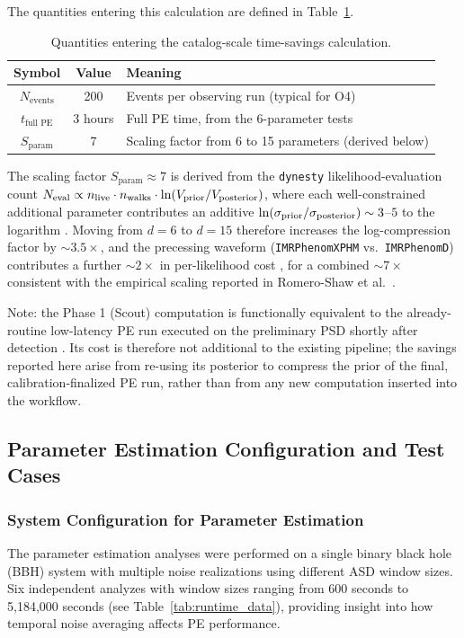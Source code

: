 \documentclass[12pt]{article}
\begin{document}
The quantities entering this calculation are defined in Table~\ref{tab:savings_inputs}.

\begin{table}[ht]
\centering
\caption{Quantities entering the catalog-scale time-savings calculation.}
\label{tab:savings_inputs}
\begin{tabular}{|c|c|l|}
\hline
\textbf{Symbol} & \textbf{Value} & \textbf{Meaning} \\
\hline
$N_{\text{events}}$ & 200 & Events per observing run (typical for O4) \\
$t_{\text{full PE}}$ & 3 hours & Full PE time, from the 6-parameter tests \\
$S_{\text{param}}$ & 7 & Scaling factor from 6 to 15 parameters (derived below) \\
\hline
\end{tabular}
\end{table}

The scaling factor $S_{\text{param}} \approx 7$ is derived from the \texttt{dynesty} likelihood-evaluation count $N_{\rm eval} \propto n_{\rm live} \cdot n_{\rm walks} \cdot \ln(V_{\rm prior}/V_{\rm posterior})$, where each well-constrained additional parameter contributes an additive $\ln(\sigma_{\rm prior}/\sigma_{\rm posterior}) \sim 3$--$5$ to the logarithm \cite{Skilling2006,HigsonNS2019,Romero-Shaw2020}. Moving from $d=6$ to $d=15$ therefore increases the log-compression factor by $\sim 3.5\times$, and the precessing waveform (\texttt{IMRPhenomXPHM} vs.\ \texttt{IMRPhenomD}) contributes a further $\sim 2\times$ in per-likelihood cost \cite{Pratten2020}, for a combined $\sim 7\times$ consistent with the empirical scaling reported in Romero-Shaw et al.\ \cite{Romero-Shaw2020}.

Note: the Phase 1 (Scout) computation is functionally equivalent to the already-routine low-latency PE run executed on the preliminary PSD shortly after detection \cite{Chaudhary2024}. Its cost is therefore not additional to the existing pipeline; the savings reported here arise from re-using its posterior to compress the prior of the final, calibration-finalized PE run, rather than from any new computation inserted into the workflow.

\subsection{Parameter Estimation Configuration and Test Cases}
\label{appendix:pe_configuration}

\subsubsection{System Configuration for Parameter Estimation}
The parameter estimation analyses were performed on a single binary black hole (BBH) system with multiple noise realizations using different ASD window sizes. Six independent analyzes with window sizes ranging from 600 seconds to 5,184,000 seconds (see Table~\ref{tab:runtime_data}), providing insight into how temporal noise averaging affects PE performance.
\end{document}
